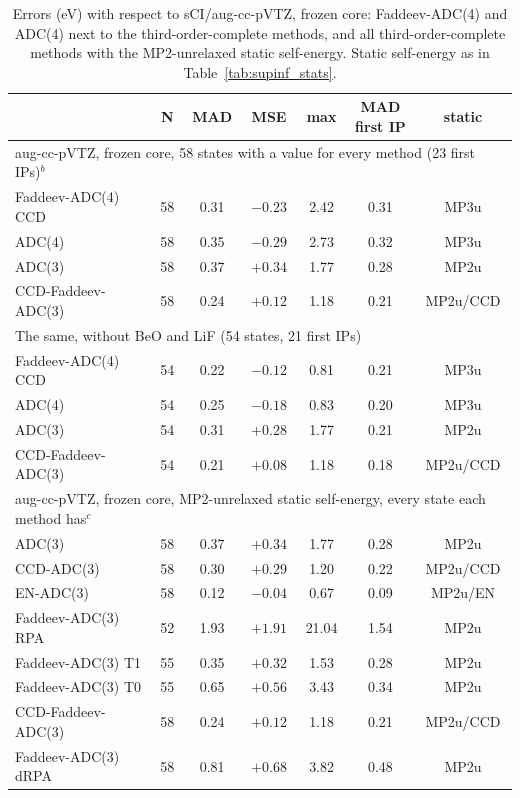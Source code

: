 \begin{table}[hbt!]
\centering
\caption{Errors (eV) with respect to sCI/aug-cc-pVTZ, frozen core: Faddeev-ADC(4) and ADC(4) next to the third-order-complete methods, and all third-order-complete methods with the MP2-unrelaxed static self-energy. Static self-energy as in Table~\ref{tab:supinf_stats}.}
\label{tab:supinf_stats_atz}
\footnotesize
\begin{tabular}{lcccccc}
\toprule
 & N & MAD & MSE & max & \makecell{MAD\\first IP} & static \\
\midrule
\multicolumn{7}{l}{aug-cc-pVTZ, frozen core, 58 states with a value for every method (23 first IPs)$^{b}$} \\
\midrule
Faddeev-ADC(4) CCD & 58 & 0.31 & $-0.23$ & 2.42 & 0.31 & MP3u \\
ADC(4) & 58 & 0.35 & $-0.29$ & 2.73 & 0.32 & MP3u \\
ADC(3) & 58 & 0.37 & $+0.34$ & 1.77 & 0.28 & MP2u \\
CCD-Faddeev-ADC(3) & 58 & 0.24 & $+0.12$ & 1.18 & 0.21 & MP2u/CCD \\
\midrule
\multicolumn{7}{l}{The same, without BeO and LiF (54 states, 21 first IPs)} \\
\midrule
Faddeev-ADC(4) CCD & 54 & 0.22 & $-0.12$ & 0.81 & 0.21 & MP3u \\
ADC(4) & 54 & 0.25 & $-0.18$ & 0.83 & 0.20 & MP3u \\
ADC(3) & 54 & 0.31 & $+0.28$ & 1.77 & 0.21 & MP2u \\
CCD-Faddeev-ADC(3) & 54 & 0.21 & $+0.08$ & 1.18 & 0.18 & MP2u/CCD \\
\midrule
\multicolumn{7}{l}{aug-cc-pVTZ, frozen core, MP2-unrelaxed static self-energy, every state each method has$^{c}$} \\
\midrule
ADC(3) & 58 & 0.37 & $+0.34$ & 1.77 & 0.28 & MP2u \\
CCD-ADC(3) & 58 & 0.30 & $+0.29$ & 1.20 & 0.22 & MP2u/CCD \\
EN-ADC(3) & 58 & 0.12 & $-0.04$ & 0.67 & 0.09 & MP2u/EN \\
Faddeev-ADC(3) RPA & 52 & 1.93 & $+1.91$ & 21.04 & 1.54 & MP2u \\
Faddeev-ADC(3) T1 & 55 & 0.35 & $+0.32$ & 1.53 & 0.28 & MP2u \\
Faddeev-ADC(3) T0 & 55 & 0.65 & $+0.56$ & 3.43 & 0.34 & MP2u \\
CCD-Faddeev-ADC(3) & 58 & 0.24 & $+0.12$ & 1.18 & 0.21 & MP2u/CCD \\
Faddeev-ADC(3) dRPA & 58 & 0.81 & $+0.68$ & 3.82 & 0.48 & MP2u \\
\bottomrule
\end{tabular}
\par\smallskip
{\raggedright\footnotesize

}
\end{table}

